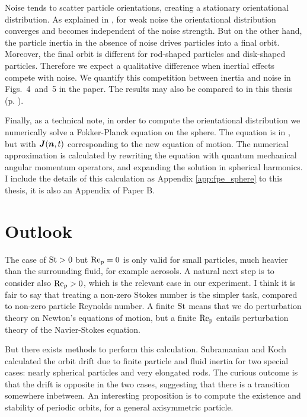 \documentclass[thesis.tex]{subfiles}
\begin{document}
Noise tends to scatter particle orientations, creating a stationary orientational distribution. As explained in , for weak noise the orientational distribution converges and becomes independent of the noise strength. But on the other hand, the particle inertia in the absence of noise drives particles into a final orbit. Moreover, the final orbit is different for rod-shaped particles and disk-shaped particles. Therefore we expect a qualitative difference when inertial effects compete with noise. We quantify this competition between inertia and noise in Figs.~4~and~5 in the paper. The results may also be compared to  in this thesis (p. \pageref{fig:sintheta1}).

Finally, as a technical note, in order to compute the orientational distribution we numerically solve a Fokker-Planck equation on the sphere. The equation is  in , but with $\mbox{\boldmath$J$}(\mbox{\boldmath$n$}, t)$ corresponding to the new equation of motion. The numerical approximation is calculated by rewriting the equation with quantum mechanical angular momentum operators, and expanding the solution in spherical harmonics. I include the details of this calculation as Appendix \ref{app:fpe_sphere} to this thesis, it is also an Appendix of Paper B.

\section{Outlook}

The case of $\mbox{St}>0$ but $\mbox{Re}_{\mathrm p}=0$ is only valid for small particles, much heavier than the surrounding fluid, for example aerosols. A natural next step is to consider also $\mbox{Re}_{\mathrm p} > 0$, which is the relevant case in our experiment. I think it is fair to say that treating a non-zero Stokes number is the simpler task, compared to non-zero particle Reynolds number. A finite $\mbox{St}$ means that we do perturbation theory on Newton's equations of motion, but a finite $\mbox{Re}_{\mathrm p}$ entails perturbation theory of the Navier-Stokes equation.

But there exists methods to perform this calculation. Subramanian and Koch \cite{subramanian2005,subramanian2006} calculated the orbit drift due to finite particle and fluid inertia for two special cases: nearly spherical particles and very elongated rods. The curious outcome is that the drift is opposite in the two cases, suggesting that there is a transition somewhere inbetween. An interesting proposition is to compute the existence and stability of periodic orbits, for a general axisymmetric particle. 
\end{document}
